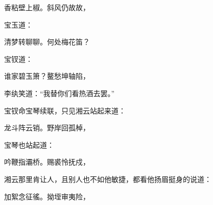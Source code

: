 \begin{poem}
    \begin{pl} 香粘壁上椒。斜风仍故故，\end{pl}
\end{poem}


\begin{parag}
    宝玉道：
\end{parag}


\begin{poem}
    \begin{pl} 清梦转聊聊。何处梅花笛？\end{pl}
\end{poem}


\begin{parag}
    宝钗道：
\end{parag}


\begin{poem}
    \begin{pl} 谁家碧玉箫？鳌愁坤轴陷，\end{pl}
\end{poem}


\begin{parag}
    李纨笑道：“我替你们看热酒去罢。”
\end{parag}


\begin{parag}
    宝钗命宝琴续联，只见湘云站起来道：
\end{parag}


\begin{poem}
    \begin{pl} 龙斗阵云销。野岸回孤棹，\end{pl}
\end{poem}


\begin{parag}
    宝琴也站起道：
\end{parag}


\begin{poem}
    \begin{pl} 吟鞭指灞桥。赐裘怜抚戍，\end{pl}
\end{poem}


\begin{parag}
    湘云那里肯让人，且别人也不如他敏捷，都看他扬眉挺身的说道：
\end{parag}


\begin{poem}
    \begin{pl} 加絮念征徭。拗垤审夷险，\end{pl}
\end{poem}


